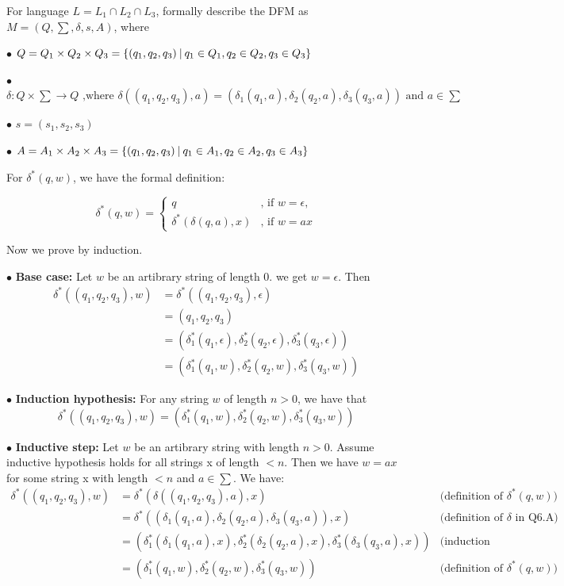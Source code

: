 \documentclass[12pt,a4paper]{article}
\newcommand{\question}[1]{\bigskip\noindent{\textbf{Q{#1} solution}}}
\begin{document}
\question{6.A}

\noindent For language $L = L_1 \cap L_2 \cap L_3$, formally describe the DFM as  $M = (Q,\sum,\delta,s,A)$, where

$\bullet$ $Q = Q_1 \times Q_2 \times Q_3 = \{(q_1,q_2,q_3)\ \vline\ q_1 \in Q_1, q_2 \in Q_2, q_3 \in Q_3\}$

$\bullet$ $\delta:Q \times \sum \rightarrow Q \mbox{ ,where } \delta((q_1,q_2,q_3),a) = (\delta_1(q_1,a),\delta_2(q_2,a),\delta_3(q_3,a)) \mbox{ and } a \in \sum$

$\bullet$ $s = (s_1,s_2,s_3)$

$\bullet$ $A = A_1 \times A_2 \times A_3 = \{(q_1,q_2,q_3)\ \vline\ q_1 \in A_1, q_2 \in A_2, q_3 \in A_3\}$

\question{6.B}

For $\delta^*(q,w)$, we have the formal definition:

\begin{equation*}
\delta^*(q,w) = 
  \begin{cases}
    q & \mbox{, if } w = \epsilon, \\
    \delta^*(\delta(q,a),x) & \mbox{, if } w = ax
  \end{cases}
\end{equation*}

Now we prove by induction. 

$\bullet$ \textbf{Base case:} Let $w$ be an artibrary string of length 0. we get $w = \epsilon$. Then
\begin{align*}
\delta^*((q_1,q_2,q_3),w) &= \delta^*((q_1,q_2,q_3),\epsilon) \\
    &= (q_1,q_2,q_3) \\ 
    &= (\delta_1^*(q_1,\epsilon), \delta_2^*(q_2,\epsilon), \delta_3^*(q_3,\epsilon)) \\
    &= (\delta_1^*(q_1,w), \delta_2^*(q_2,w), \delta_3^*(q_3,w))
\end{align*}

$\bullet$ \textbf{Induction hypothesis:} For any string $w$ of length $n > 0$, we have that
\begin{equation*}
  \delta^*((q_1,q_2,q_3),w) = (\delta_1^*(q_1,w), \delta_2^*(q_2,w), \delta_3^*(q_3,w))
\end{equation*}

$\bullet$ \textbf{Inductive step:} Let $w$ be an artibrary string with length $n > 0$. Assume inductive hypothesis holds for all strings x of length $< n$. Then we have $w = ax$ for some string x with length $< n$ and $a \in \sum$. We have:
\begin{align*}
  \delta^*((q_1,q_2,q_3),w) &= \delta^*(\delta((q_1,q_2,q_3), a), x) &\mbox{(definition of $\delta^*(q,w)$) }\\
      &= \delta^*((\delta_1(q_1,a), \delta_2(q_2,a), \delta_3(q_3,a)), x) &\mbox{(definition of $\delta$ in Q6.A)}\\
      &= (\delta_1^*(\delta_1(q_1,a), x),\delta_2^*(\delta_2(q_2,a), x),\delta_3^*(\delta_3(q_3,a), x)) &\mbox{(induction hypothesis)}\\
      &= (\delta_1^*(q_1,w), \delta_2^*(q_2,w), \delta_3^*(q_3,w)) &\mbox{(definition of $\delta^*(q,w)$) }
\end{align*}
\end{document}
